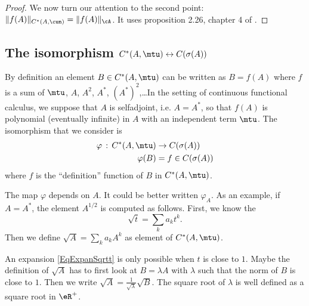 \begin{proof}
We now turn our attention to the second point: $\| f(A) \|_{C^*(A,\cun)}=\| f(A) \|_{\cA}$. It uses proposition 2.26, chapter 4 of \cite{LaHarpe}.

\end{proof}

\subsection{The isomorphism \texorpdfstring{$C^*(A,\mtu)\leftrightarrow C(\sigma(A))$}{AAm AsA}}

By definition an element $B\in C^*(A,\mtu)$ can be written as $B=f(A)$ where $f$ is a sum of $\mtu$, $A$, $A^2$, $A^*$, $(A^*)^2$,\ldots In the setting of continuous functional calculus, we suppose that $A$ is selfadjoint, i.e. $A=A^*$, so that $f(A)$ is polynomial (eventually infinite) in $A$ with an independent term $\mtu$. The isomorphism that we consider is
\begin{equation}
\begin{aligned}
 \varphi\,:\,C^*(A,\mtu)&\to C(\sigma(A))\\
    \varphi(B)&=f\in C(\sigma(A))
\end{aligned}
\end{equation}
where $f$ is the ``definition'' function of $B$ in $C^*(A,\mtu)$.

\begin{remark}      \label{RemExpansionSqrtConCal}
    The map $\varphi$ depends on $A$. It could be better written $\varphi_A$. As an example, if $A=A^*$, the element $A^{1/2}$ is computed as follows. First, we know the 
    \begin{equation}        \label{EqExpanSqrtt}
        \sqrt{t}=\sum_ka_kt^k.
    \end{equation}
    Then we define $\sqrt{A}=\sum_k a_kA^k$ as element of $C^*(A,\mtu)$.
\end{remark}

\begin{probleme}
    An expansion \eqref{EqExpanSqrtt} is only possible when $t$ is close to $1$. Maybe the definition of $\sqrt{A}$ has to first look at $B=\lambda A$ with $\lambda$ such that the norm of $B$ is close to $1$. Then we write $\sqrt{A}=\frac{1}{ \sqrt{\lambda} }\sqrt{B}$. The square root of $\lambda$ is well defined as a square root in $\eR^+$.
\end{probleme}


